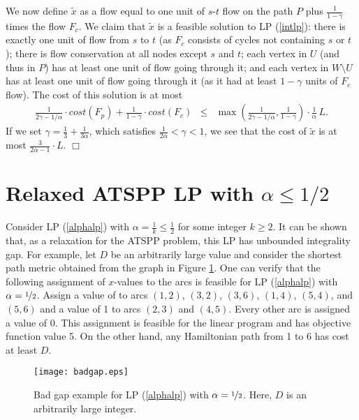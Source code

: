 \documentclass[11pt]{article}
\newcommand{\qed}{\hspace*{\fill}$\Box$}
\newenvironment{proof}[1][Proof. ]{\noindent {\bf #1 }}{\qed}
\begin{document}
\begin{proof}
We now define $\tilde{x}$ as a flow equal to one unit of $s$-$t$ flow on the path $P$ plus 
$\frac{1}{1-\gamma}$ times the flow $F_c$.  We claim that $\tilde{x}$ is a feasible solution 
to LP (\ref{intlp}): there is exactly one unit of flow from $s$ to $t$ (as $F_c$ consists of 
cycles not containing $s$ or $t$); there is flow conservation at all nodes except $s$ and $t$; 
each vertex in $U$ (and thus in $P$) has at least one unit of flow going through it; and each 
vertex in $W\setminus U$ has at least one unit of flow going through it (as it had at least 
$1-\gamma$ units of $F_c$ flow).  The cost of this solution is at most 
\begin{eqnarray*}
 \frac{1}{2\gamma-1/\alpha}\cdot cost(F_p) + \frac{1}{1-\gamma}\cdot cost(F_c)
 & \leq&  \max\left(\frac{1}{2\gamma-1/\alpha}, \frac{1}{1-\gamma}\right) 
\cdot \frac{1}{\alpha}\, L.
\end{eqnarray*}
If we set $\gamma = \frac{1}{3} + \frac{1}{3\alpha}$, which satisfies $\frac{1}{2\alpha}<\gamma < 1$, 
we see that the cost of $\tilde{x}$ is at most $\frac{3}{2\alpha-1}\cdot L$.
\end{proof}



\section{Relaxed ATSPP LP with $\alpha \leq 1/2$} \label{sec:atspp-alpha2}

Consider LP (\ref{alphalp}) with $\alpha = \frac{1}{k} \leq \frac{1}{2}$ for some integer $k \geq 2$. 
It can be shown that, as a relaxation for the ATSPP problem, this LP has unbounded integrality gap.
For example, let $D$ be an arbitrarily large value and consider the shortest path metric obtained from
the graph in Figure \ref{fig:badgap}. One can verify that the following assignment of $x$-values
to the arcs is feasible for LP (\ref{alphalp}) with $\alpha = \nicefrac{1}{2}$.
Assign a value of  to arcs $(1,2)$, $(3,2)$, $(3,6)$, $(1,4)$, $(5,4)$, 
and $(5,6)$ and a value of 1 to arcs $(2,3)$ and $(4,5)$.
Every other arc is assigned a value of 0. This assignment is feasible for the linear program and
has objective function value 5. On the other hand, any Hamiltonian path
from 1 to 6 has cost at least $D$.


\begin{figure}
\begin{center}
\texttt{[image: badgap.eps]}
\caption{Bad gap example for LP (\ref{alphalp}) with $\alpha = \nicefrac{1}{2}$. Here, $D$ is an arbitrarily large integer.}\label{fig:badgap}
\end{center}
\end{figure}
\end{document}

